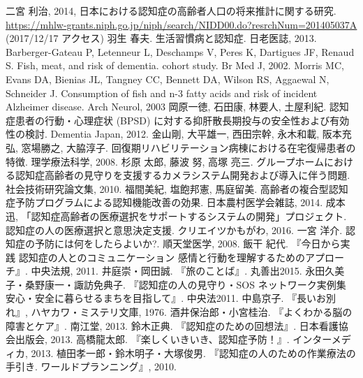 \documentclass[openany,11pt,papersize]{jsbook}
\begin{document}

\begin{thebibliography}{9}
     二宮 利治, 2014, 日本における認知症の高齢者人口の将来推計に関する研究. \\ \url{https://mhlw-grants.niph.go.jp/niph/search/NIDD00.do?resrchNum=201405037A} (2017/12/17 アクセス)
     羽生 春夫. 生活習慣病と認知症. 日老医誌, 2013.
     Barberger-Gateau P, Letenneur L, Deschamps V, Peres K, Dartigues JF, Renaud S. Fish, meat, and risk of dementia. cohort study. Br Med J, 2002.
     Morris MC, Evans DA, Bienias JL, Tangney  CC, Bennett DA, Wilson RS, Aggaewal N, Schneider J. Consumption of fish and n-3 fatty acids and risk of incident Alzheimer disease. Arch Neurol, 2003
     岡原一徳, 石田康, 林要人, 土屋利紀. 認知症患者の行動・心理症状 (BPSD) に対する抑肝散長期投与の安全性および有効性の検討. Dementia Japan, 2012.
     金山剛, 大平雄一, 西田宗幹, 永木和載, 阪本充弘, 窓場勝之, 大脇淳子. 回復期リハビリテーション病棟における在宅復帰患者の特徴. 理学療法科学, 2008.
     杉原 太郎, 藤波 努, 高塚 亮三. グループホームにおける認知症高齢者の見守りを支援するカメラシステム開発および導入に伴う問題. 社会技術研究論文集, 2010.
     福間美紀, 塩飽邦憲, 馬庭留美. 高齢者の複合型認知症予防プログラムによる認知機能改善の効果. 日本農村医学会雑誌, 2014.
     成本 迅, 「認知症高齢者の医療選択をサポートするシステムの開発」プロジェクト. 認知症の人の医療選択と意思決定支援. クリエイツかもがわ, 2016.
     一宮 洋介. 認知症の予防には何をしたらよいか?. 順天堂医学, 2008.
    \bibitem{} 飯干 紀代. 『今日から実践 認知症の人とのコミュニケーション 感情と行動を理解するためのアプローチ』. 中央法規, 2011.
    \bibitem{} 井庭崇・岡田誠. 『旅のことば』. 丸善出2015.
    \bibitem{} 永田久美子・桑野康一・諏訪免典子. 『認知症の人の見守り・SOS ネットワーク実例集 安心・安全に暮らせるまちを目指して』. 中央法2011.
    \bibitem{} 中島京子. 『長いお別れ』, ハヤカワ・ミステリ文庫, 1976.
    \bibitem{} 酒井保治郎・小宮桂治. 『よくわかる脳の障害とケア』. 南江堂, 2013.
    \bibitem{} 鈴木正典. 『認知症のための回想法』. 日本看護協会出版会, 2013.
    \bibitem{} 高橋龍太郎. 『楽しくいきいき、認知症予防！』. インターメディカ, 2013.
    \bibitem{} 植田孝一郎・鈴木明子・大塚俊男. 『認知症の人のための作業療法の手引き. ワールドプランニング』, 2010.
\end{thebibliography}
\end{document}
